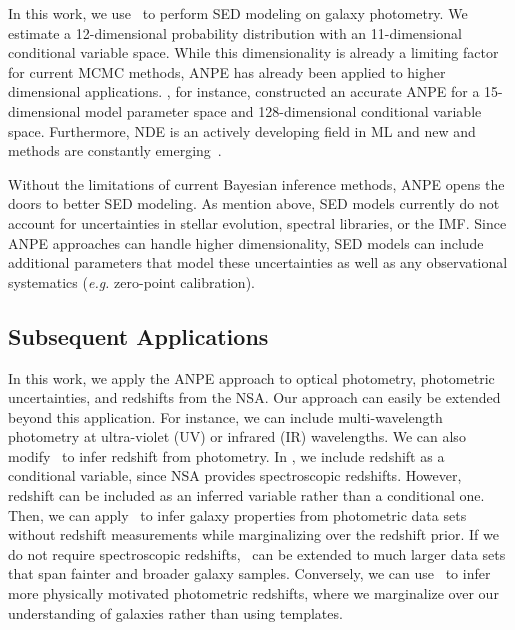 In this work, we use \sedflow~to perform SED modeling on galaxy photometry. 
We estimate a 12-dimensional probability distribution with an 11-dimensional
conditional variable space. 
While this dimensionality is already a limiting factor for current MCMC
methods, ANPE has already been applied to higher dimensional applications.
\cite{dax2021}, for instance, constructed an accurate ANPE for a
15-dimensional model parameter space and 128-dimensional conditional variable
space.
Furthermore, NDE is an actively developing field in ML and new and methods are
constantly emerging~\citep[\eg][]{wu2020, dhariwal2021}. 

Without the limitations of current Bayesian inference methods, ANPE opens the
doors to better SED modeling. 
As mention above, SED models currently do not account for uncertainties in
stellar evolution, spectral libraries, or the IMF. 
Since ANPE approaches can handle higher dimensionality, SED models can include 
additional parameters that model these uncertainties as well as any
observational systematics (\emph{e.g.} zero-point calibration). 

\subsection{Subsequent Applications} 
In this work, we apply the ANPE approach to optical photometry, photometric
uncertainties, and redshifts from the NSA. 
Our approach can easily be extended beyond this application. 
For instance, we can include multi-wavelength photometry at ultra-violet (UV)
or infrared (IR) wavelengths. 
We can also modify \sedflow~to infer redshift from photometry. 
In \sedflow, we include redshift as a conditional variable, since NSA provides
spectroscopic redshifts. 
However, redshift can be included as an inferred variable rather than a
conditional one. 
Then, we can apply \sedflow~to infer galaxy properties from photometric data
sets without redshift measurements while marginalizing over the redshift
prior. 
If we do not require spectroscopic redshifts, \sedflow~can be extended to much
larger data sets that span fainter and broader galaxy samples. 
Conversely, we can use \sedflow~to infer more physically motivated photometric 
redshifts, where we marginalize over our understanding of galaxies rather than
using templates. 

